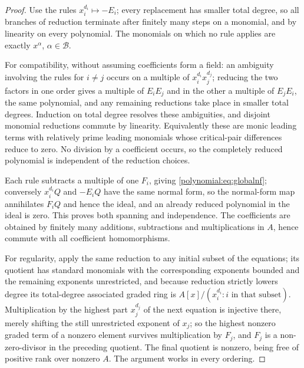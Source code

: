 \documentclass[11pt,letterpaper]{article}
\numberwithin{equation}{section}
\theoremstyle{definition}
\theoremstyle{remark}\newtheorem{remark}[theorem]{Remark}
\begin{document}
\begin{proof}
Use the rules $x_i^{d_i}\mapsto-E_i$; every replacement has smaller total
degree, so all branches of reduction terminate after finitely many steps on a
monomial, and by linearity on every polynomial. The monomials on which no rule
applies are exactly $x^\alpha$, $\alpha\in\mathcal B$.

For compatibility, without assuming coefficients form a field: an ambiguity
involving the rules for $i\ne j$ occurs on a multiple of
$x_i^{d_i}x_j^{d_j}$; reducing the two factors in one order gives a multiple
of $E_iE_j$ and in the other a multiple of $E_jE_i$, the same polynomial, and
any remaining reductions take place in smaller total degrees. Induction on
total degree resolves these ambiguities, and disjoint monomial reductions
commute by linearity. Equivalently these are monic leading terms with
relatively prime leading monomials whose critical-pair differences reduce to
zero. No division by a coefficient occurs, so the completely reduced
polynomial is independent of the reduction choices.

Each rule subtracts a multiple of one $F_i$, giving
\eqref{polynomial:eq:globalnf}; conversely $x_i^{d_i}Q$ and $-E_iQ$ have the
same normal form, so the normal-form map annihilates $F_iQ$ and hence the
ideal, and an already reduced polynomial in the ideal is zero. This proves
both spanning and independence. The coefficients are obtained by finitely many
additions, subtractions and multiplications in $A$, hence commute with all
coefficient homomorphisms.

For regularity, apply the same reduction to any initial subset of the
equations; its quotient has standard monomials with the corresponding
exponents bounded and the remaining exponents unrestricted, and because
reduction strictly lowers degree its total-degree associated graded ring is
$A[x]/(x_i^{d_i}:i\text{ in that subset})$. Multiplication by the highest part
$x_j^{d_j}$ of the next equation is injective there, merely shifting the still
unrestricted exponent of $x_j$; so the highest nonzero graded term of a
nonzero element survives multiplication by $F_j$, and $F_j$ is a
non-zero-divisor in the preceding quotient. The final quotient is nonzero,
being free of positive rank over nonzero $A$. The argument works in every
ordering.
\end{proof}
\end{document}
